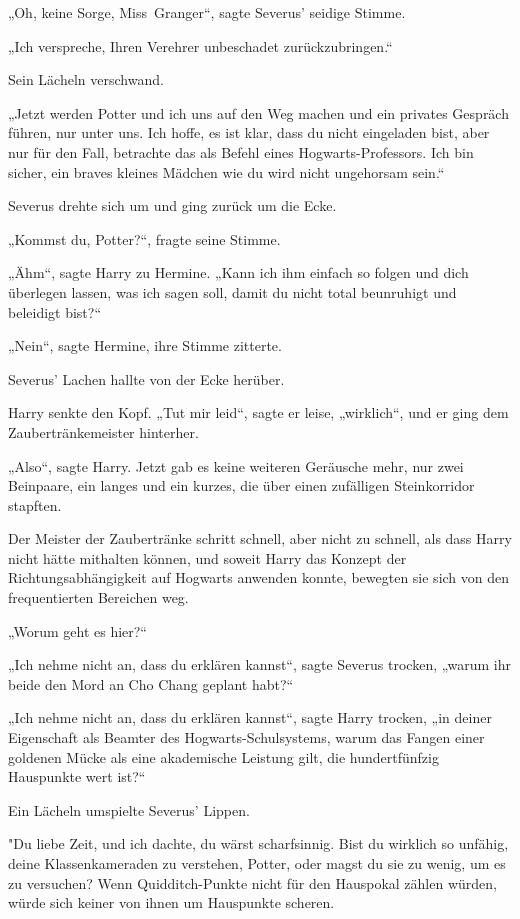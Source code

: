 {„Oh, keine Sorge, Miss~Granger“, sagte Severus' seidige Stimme.

„Ich verspreche, Ihren Verehrer unbeschadet zurückzubringen.“

Sein Lächeln verschwand.

„Jetzt werden Potter und ich uns auf den Weg machen und ein privates Gespräch führen, nur unter uns. Ich hoffe, es ist klar, dass du nicht eingeladen bist, aber nur für den Fall, betrachte das als Befehl eines Hogwarts-Professors. Ich bin sicher, ein braves kleines Mädchen wie du wird nicht ungehorsam sein.“

Severus drehte sich um und ging zurück um die Ecke.

„Kommst du, Potter?“, fragte seine Stimme.

„Ähm“, sagte Harry zu Hermine. „Kann ich ihm einfach so folgen und dich überlegen lassen, was ich sagen soll, damit du nicht total beunruhigt und beleidigt bist?“

„Nein“, sagte Hermine, ihre Stimme zitterte.

Severus' Lachen hallte von der Ecke herüber.

Harry senkte den Kopf. „Tut mir leid“, sagte er leise, „wirklich“, und er ging dem Zaubertränkemeister hinterher.

„Also“, sagte Harry. Jetzt gab es keine weiteren Geräusche mehr, nur zwei Beinpaare, ein langes und ein kurzes, die über einen zufälligen Steinkorridor stapften.

Der Meister der Zaubertränke schritt schnell, aber nicht zu schnell, als dass Harry nicht hätte mithalten können, und soweit Harry das Konzept der Richtungsabhängigkeit auf Hogwarts anwenden konnte, bewegten sie sich von den frequentierten Bereichen weg.

„Worum geht es hier?“

„Ich nehme nicht an, dass du erklären kannst“, sagte Severus trocken, „warum ihr beide den Mord an Cho Chang geplant habt?“

„Ich nehme nicht an, dass du erklären kannst“, sagte Harry trocken, „in deiner Eigenschaft als Beamter des Hogwarts-Schulsystems, warum das Fangen einer goldenen Mücke als eine akademische Leistung gilt, die hundertfünfzig Hauspunkte wert ist?“

Ein Lächeln umspielte Severus' Lippen.

"Du liebe Zeit, und ich dachte, du wärst scharfsinnig. Bist du wirklich so unfähig, deine Klassenkameraden zu verstehen, Potter, oder magst du sie zu wenig, um es zu versuchen? Wenn Quidditch-Punkte nicht für den Hauspokal zählen würden, würde sich keiner von ihnen um Hauspunkte scheren.

}
